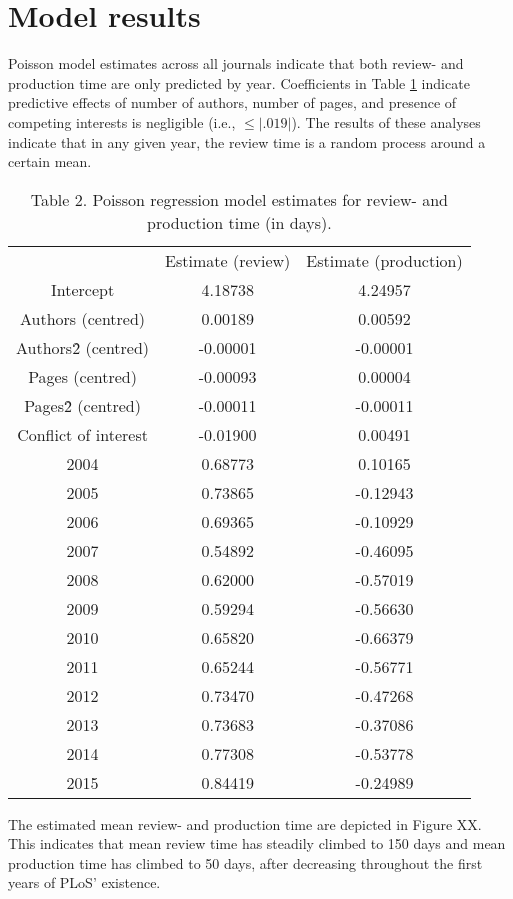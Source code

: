 \section*{Model results}
Poisson model estimates across all journals indicate that both review- and production time are only predicted by year. Coefficients in Table \ref{tab:tab2} indicate predictive effects of number of authors, number of pages, and presence of competing interests is negligible (i.e., $\leq |.019|$). The results of these analyses indicate that in any given year, the review time is a random process around a certain mean.

\begin{table}
\caption{Table 2. Poisson regression model estimates for review- and production time (in days).}
\label{tab:tab2}
\begin{tabular}{ c c c }
    & Estimate (review) & Estimate (production) \\
    Intercept & 4.18738 & 4.24957 \\
    Authors (centred) & 0.00189 & 0.00592 \\
    Authors\^2 (centred) & -0.00001 & -0.00001 \\
    Pages (centred) & -0.00093 & 0.00004 \\
    Pages\^2 (centred) & -0.00011 & -0.00011 \\
    Conflict of interest & -0.01900 & 0.00491 \\
    2004  & 0.68773 & 0.10165 \\
    2005  & 0.73865 & -0.12943 \\
    2006  & 0.69365 & -0.10929 \\
    2007  & 0.54892 & -0.46095 \\
    2008  & 0.62000 & -0.57019 \\
    2009  & 0.59294 & -0.56630 \\
    2010  & 0.65820 & -0.66379 \\
    2011  & 0.65244 & -0.56771 \\
    2012  & 0.73470 & -0.47268 \\
    2013  & 0.73683 & -0.37086 \\
    2014  & 0.77308 & -0.53778 \\
    2015  & 0.84419 & -0.24989 \\
\end{tabular}
\end{table}

The estimated mean review- and production time are depicted in Figure XX. This indicates that mean review time has steadily climbed to 150 days and mean production time has climbed to 50 days, after decreasing throughout the first years of PLoS' existence.

